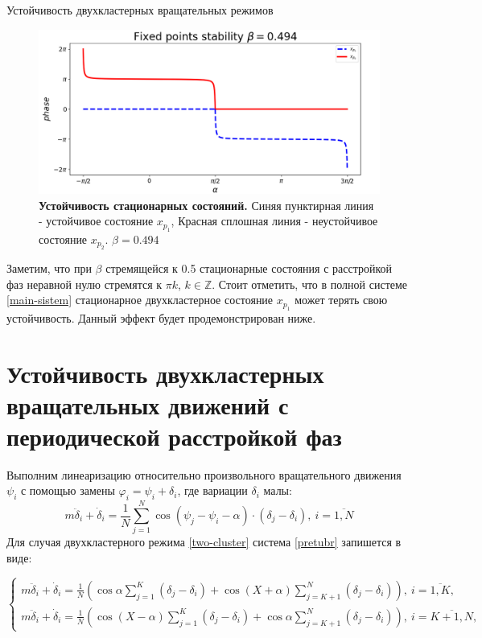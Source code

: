 \begin{chapter}{Устойчивость двухкластерных вращательных режимов}
	\begin{figure}[h!]
		\begin{center}
			\includegraphics[width=1\columnwidth]{pictures/fixed-points-3.png}
		\end{center}
		\caption{\textbf{Устойчивость стационарных состояний.}
		Синяя пунктирная линия - устойчивое состояние $x_{p_1}$,
		Красная сплошная линия - неустойчивое состояние $x_{p_2}$.
		$\beta = 0.494$}
	\end{figure}

	Заметим, что при $\beta$ стремящейся к 0.5 стационарные состояния с расстройкой фаз неравной нулю стремятся
	к $\pi k$, $k \in \mathbb{Z}$.
	Стоит отметить, что в полной системе \ref{main-sistem} стационарное двухкластерное состояние $x_{p_1}$
	может терять свою устойчивость. Данный эффект будет продемонстрирован ниже.
	
	\section{Устойчивость двухкластерных вращательных движений с периодической расстройкой фаз}

	Выполним линеаризацию относительно произвольного вращательного движения $\psi_i$ с помощью замены $\varphi_i = \psi_i + \delta_i$, где вариации $\delta_i$ малы:
	\begin{equation} \label{pretubr}
		m\ddot{\delta}_i + \dot{\delta}_i = \frac{1}{N} \sum_{j = 1}^N \cos{(\psi_j - \psi_i - \alpha)} \cdot (\delta_j - \delta_i), \ i = \overline{1, N}
	\end{equation}
	Для случая двухкластерного режима \ref{two-cluster} система \ref{pretubr} запишется в виде:
	
	\begin{equation}
		\begin{cases}
			m\ddot{\delta}_i + \dot{\delta}_i = \frac{1}{N} \left( \cos{\alpha} \sum_{j = 1}^K (\delta_j - \delta_i) + \cos{(X + \alpha)} \sum_{j = K + 1}^N (\delta_j - \delta_i) \right), \ i = \overline{1,K}, \\
			m\ddot{\delta}_i + \dot{\delta}_i = \frac{1}{N} \left( \cos{(X - \alpha)} \sum_{j = 1}^K (\delta_j - \delta_i) +  \cos{\alpha} \sum_{j = K + 1}^N (\delta_j - \delta_i)  \right), \ i = \overline{K + 1,N},
		\end{cases}		
	\end{equation}
	

\end{chapter}
